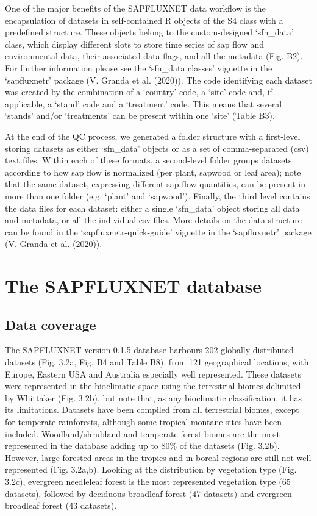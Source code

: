 \documentclass[11pt,twoside]{reedthesis}
\begin{document}
One of the major benefits of the SAPFLUXNET data workflow is the
encapsulation of datasets in self-contained R objects of the S4 class
with a predefined structure. These objects belong to the custom-designed
`sfn\_data' class, which display different slots to store time series of
sap flow and environmental data, their associated data flags, and all
the metadata (Fig. B2). For further information please see the
`sfn\_data classes' vignette in the `sapfluxnetr' package (V. Granda et
al. (2020)). The code identifying each dataset was created by the
combination of a `country' code, a `site' code and, if applicable, a
`stand' code and a `treatment' code. This means that several `stands'
and/or `treatments' can be present within one `site' (Table B3).\par

At the end of the QC process, we generated a folder structure with a
first-level storing datasets as either `sfn\_data' objects or as a set
of comma-separated (csv) text files. Within each of these formats, a
second-level folder groups datasets according to how sap flow is
normalized (per plant, sapwood or leaf area); note that the same
dataset, expressing different sap flow quantities, can be present in
more than one folder (e.g. `plant' and `sapwood'). Finally, the third
level contains the data files for each dataset: either a single
`sfn\_data' object storing all data and metadata, or all the individual
csv files. More details on the data structure can be found in the
`sapfluxnetr-quick-guide' vignette in the `sapfluxnetr' package (V.
Granda et al. (2020)).\par

\section{The SAPFLUXNET database}\label{the-sapfluxnet-database}

\subsection{Data coverage}\label{data-coverage}

The SAPFLUXNET version 0.1.5 database harbours 202 globally distributed
datasets (Fig. 3.2a, Fig. B4 and Table B8), from 121 geographical
locations, with Europe, Eastern USA and Australia especially well
represented. These datasets were represented in the bioclimatic space
using the terrestrial biomes delimited by Whittaker (Fig. 3.2b), but
note that, as any bioclimatic classification, it has its limitations.
Datasets have been compiled from all terrestrial biomes, except for
temperate rainforests, although some tropical montane sites have been
included. Woodland/shrubland and temperate forest biomes are the most
represented in the database adding up to 80\% of the datasets (Fig.
3.2b). However, large forested areas in the tropics and in boreal
regions are still not well represented (Fig. 3.2a,b). Looking at the
distribution by vegetation type (Fig. 3.2c), evergreen needleleaf forest
is the most represented vegetation type (65 datasets), followed by
deciduous broadleaf forest (47 datasets) and evergreen broadleaf forest
(43 datasets).\par
\end{document}
